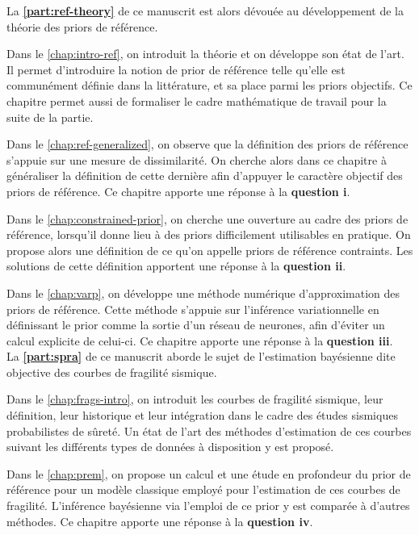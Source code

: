



La \textbf{\cref{part:ref-theory}} de ce manuscrit est alors dévouée au développement de la théorie des priors de référence.

\noindent
Dans le \cref{chap:intro-ref}, on introduit la théorie et on développe son état de l'art. Il permet d'introduire la notion de prior de référence telle qu'elle est communément définie dans la littérature, et sa place parmi les priors objectifs. Ce chapitre permet aussi de formaliser le cadre mathématique de travail pour la suite de la partie.

\noindent
Dans le \cref{chap:ref-generalized}, on observe que la définition des priors de référence s'appuie sur une mesure de dissimilarité. On cherche alors dans ce chapitre à généraliser la définition de cette dernière afin d'appuyer le caractère objectif des priors de référence. Ce chapitre apporte une réponse à la \textbf{question i}.

\noindent
Dans le \cref{chap:constrained-prior}, on cherche une ouverture au cadre des priors de référence, lorsqu'il donne lieu à des priors difficilement utilisables en pratique. On propose alors une définition de ce qu'on appelle priors de référence contraints. Les solutions de cette définition apportent une réponse à la \textbf{question ii}.

\noindent
Dans le \cref{chap:varp}, on développe une méthode numérique d'approximation des priors de référence. Cette méthode s'appuie sur l'inférence variationnelle en définissant le prior comme la sortie d'un réseau de neurones, afin d'éviter un calcul explicite de celui-ci. Ce chapitre apporte une réponse à la \textbf{question iii}. \\


La \textbf{\cref{part:spra}} de ce manuscrit aborde le sujet de l'estimation bayésienne dite objective des courbes de fragilité sismique.

\noindent
Dans le \cref{chap:frags-intro}, on introduit les courbes de fragilité sismique, leur définition, leur historique et leur intégration dans le cadre des études sismiques probabilistes de sûreté. Un état de l'art des méthodes d'estima\-tion de ces courbes suivant les différents types de données à disposition y est proposé.

\noindent
Dans le \cref{chap:prem}, on propose un calcul et une étude en profondeur du prior de référence pour un modèle classique employé pour l'estimation de ces courbes de fragilité. L'inférence bayésienne via l'emploi de ce prior y est comparée à d'autres méthodes. Ce chapitre apporte une réponse à la \textbf{question iv}.

